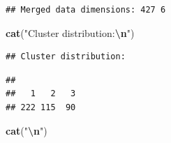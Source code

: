 \documentclass[
]{article}
\newenvironment{Shaded}{\begin{snugshade}}{\end{snugshade}}
\newcommand{\FunctionTok}[1]{\textcolor[rgb]{0.13,0.29,0.53}{\textbf{#1}}}
\newcommand{\NormalTok}[1]{#1}
\newcommand{\SpecialCharTok}[1]{\textcolor[rgb]{0.81,0.36,0.00}{\textbf{#1}}}
\newcommand{\StringTok}[1]{\textcolor[rgb]{0.31,0.60,0.02}{#1}}
\begin{document}
\begin{verbatim}
## Merged data dimensions: 427 6
\end{verbatim}

\begin{Shaded}
\begin{Highlighting}[]
\FunctionTok{cat}\NormalTok{(}\StringTok{"Cluster distribution:}\SpecialCharTok{\textbackslash{}n}\StringTok{"}\NormalTok{)}
\end{Highlighting}
\end{Shaded}

\begin{verbatim}
## Cluster distribution:
\end{verbatim}

\begin{Shaded}
\end{Shaded}

\begin{verbatim}
## 
##   1   2   3 
## 222 115  90
\end{verbatim}

\begin{Shaded}
\begin{Highlighting}[]
\FunctionTok{cat}\NormalTok{(}\StringTok{"}\SpecialCharTok{\textbackslash{}n}\StringTok{"}\NormalTok{)}
\end{Highlighting}
\end{Shaded}
\end{document}
